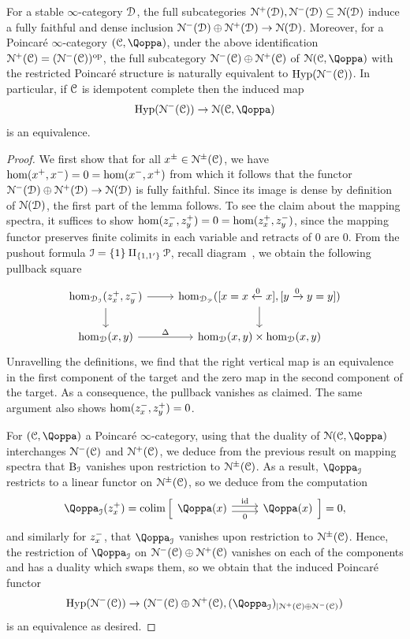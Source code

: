 \begin{lemma}
\label{lemma:nil-term-hyperbolic}%
For a stable $\infty$-category $\mathcal{D}$, the full subcategories $\mathcal{N}^+(\mathcal{D}),\mathcal{N}^-(\mathcal{D}) \subseteq \mathcal{N}(\mathcal{D})$ induce a fully faithful and dense inclusion $\mathcal{N}^-(\mathcal{D}) \oplus \mathcal{N}^+(\mathcal{D}) \to \mathcal{N}(\mathcal{D})$. Moreover, for a Poincar\'e $\infty$-category $(\C,\QF)$, under the above identification $\mathcal{N}^+(\mathcal C) = (\mathcal{N}^-(\mathcal C))^\mathrm{op}$, the full subcategory $\mathcal{N}^-(\mathcal C) \oplus \mathcal{N}^+(\mathcal C)$ of $\cN(\C,\QF)$ with the restricted Poincaré structure is naturally equivalent to $\operatorname{Hyp}(\mathcal{N}^-(\mathcal C))$. 
In particular, if $\mathcal C$ is idempotent complete then the induced map 
\[
\Hyp(\cN^-(\C)) \to \cN(\C,\QF)
\]
is an equivalence.
\end{lemma}
\begin{proof}
We first show that for all $x^\pm \in \mathcal{N}^\pm(\mathcal C)$, we have $\operatorname{hom}(x^+,x^-) = 0 = \operatorname{hom}(x^-,x^+)$ from which it follows that the functor $\mathcal{N}^-(\mathcal{D}) \oplus \mathcal{N}^+(\mathcal{D}) \to \mathcal{N}(\mathcal{D})$ is fully faithful. Since its image is dense by definition of $\mathcal{N}(\mathcal{D})$, the first part of the lemma follows. To see the claim about the mapping spectra, it suffices to show $\operatorname{hom}(z_x^-,z_y^+) = 0 = \operatorname{hom}(z_x^+,z_y^-)$, since the mapping functor preserves finite colimits in each variable and retracts of $0$ are $0$. From the pushout formula $\mathcal{I} = \{1\} \amalg_{\{1,1'\}} \mathcal{P}$, recall diagram~, we obtain the following pullback square
\[
\begin{tikzcd}
	\map_{\D_\I}(z_x^+,z_y^-) \ar[r] \ar[d] & \map_{\D_{\mathcal{P}}}([x=x\xleftarrow{0} x],[y\xrightarrow{0} y = y]) \ar[d]\\
	\map_\D(x,y) \ar[r,"\Delta"] & \map_\D(x,y) \times \map_\D(x,y)
\end{tikzcd}
\]
Unravelling the definitions, we find that the right vertical map is an equivalence in the first component of the target and the zero map in the second component of the target. As a consequence, the pullback vanishes as claimed. The same argument also shows $\operatorname{hom}(z_x^-,z_y^+) = 0$.


For $(\C,\QF)$ a Poincar\'e $\infty$-category, using that the duality of $\cN(\C,\QF)$ interchanges $\mathcal{N}^-(\mathcal C)$ and $\mathcal{N}^+(\mathcal C)$, we deduce from the previous result on mapping spectra that $\mathrm{B}_{\mathcal{I}}$ vanishes upon restriction to $\mathcal{N}^{\pm}(\mathcal C)$. As a result, $\QF_\I$ restricts to a linear functor on $\mathcal{N}^\pm(\mathcal C)$, so we deduce from the computation
\[
\QF_\I(z^{+}_{\x}) = \colim \Big[
\begin{tikzcd}
\QF(\x) \ar[r,shift right,"0"']\ar[r,shift left,"\id"] & \QF(\x) 
\end{tikzcd}
\Big] = 0,
\]
and similarly for \(z^-_{x}\), that $\QF_\I$ vanishes upon restriction to $\mathcal{N}^{\pm}(\mathcal C)$. 
Hence, the restriction of $\QF_\I$ on $\mathcal{N}^-(\mathcal C) \oplus \mathcal{N}^+(\mathcal C)$ vanishes on each of the components and has a duality which swaps them, so we obtain that the induced Poincaré functor 
\[
\Hyp(\cN^-(\C)) \to (\cN^-(\C) \oplus \cN^+(\C),(\QF_\I)_{|\cN^+(\C)\oplus \cN^-(\C)})
\]
is an equivalence as desired.
\end{proof}
 




